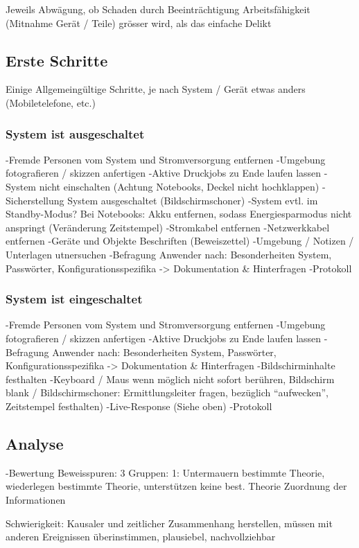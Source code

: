 Jeweils Abwägung, ob Schaden durch Beeinträchtigung Arbeitsfähigkeit (Mitnahme Gerät / Teile) grösser wird, als das einfache Delikt

\subsection{Erste Schritte}
Einige Allgemeingültige Schritte, je nach System / Gerät etwas anders (Mobiletelefone, etc.)

\subsubsection{System ist ausgeschaltet}
-Fremde Personen vom System und Stromversorgung entfernen
-Umgebung fotografieren / skizzen anfertigen
-Aktive Druckjobs zu Ende laufen lassen
-System nicht einschalten (Achtung Notebooks, Deckel nicht hochklappen)
-Sicherstellung System ausgeschaltet (Bildschirmschoner)
-System evtl. im Standby-Modus? Bei Notebooks: Akku entfernen, sodass Energiesparmodus nicht anspringt (Veränderung Zeitstempel)
-Stromkabel entfernen
-Netzwerkkabel entfernen
-Geräte und Objekte Beschriften (Beweiszettel)
-Umgebung / Notizen / Unterlagen utnersuchen
-Befragung Anwender nach: Besonderheiten System, Passwörter, Konfigurationsspezifika -> Dokumentation & Hinterfragen
-Protokoll


\subsubsection{System ist eingeschaltet}
-Fremde Personen vom System und Stromversorgung entfernen
-Umgebung fotografieren / skizzen anfertigen
-Aktive Druckjobs zu Ende laufen lassen
-Befragung Anwender nach: Besonderheiten System, Passwörter, Konfigurationsspezifika -> Dokumentation & Hinterfragen
-Bildschirminhalte festhalten
-Keyboard / Maus wenn möglich nicht sofort berühren, Bildschirm blank / Bildschirmschoner: Ermittlungsleiter fragen, bezüglich "`aufwecken"', Zeitstempel festhalten)
-Live-Response (Siehe oben)
-Protokoll

\subsection{Analyse}
-Bewertung Beweisspuren: 3 Gruppen: 1: Untermauern bestimmte Theorie, wiederlegen bestimmte Theorie, unterstützen keine best. Theorie
Zuordnung der Informationen

Schwierigkeit: Kausaler und zeitlicher Zusammenhang herstellen, müssen mit anderen Ereignissen überinstimmen, plausiebel, nachvollziehbar

